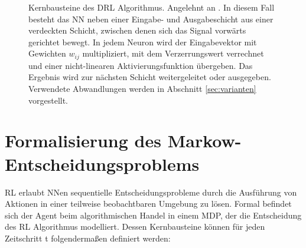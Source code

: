 \begin{figure}[!ht]
\vspace{4mm}
\caption[Kernbausteine des \acs{DRL} Algorithmus]%
{Kernbausteine des \acs{DRL} Algorithmus. Angelehnt an \parencite{drawing}. In diesem Fall besteht das \acs{NN} neben einer Eingabe- und Ausgabeschicht aus einer verdeckten Schicht, zwischen denen sich das Signal vorwärts gerichtet bewegt. In jedem Neuron wird der Eingabevektor mit Gewichten $w_{ij}$ multipliziert, mit dem Verzerrungswert verrechnet und einer nicht-linearen Aktivierungsfunktion übergeben. Das Ergebnis wird zur nächsten Schicht weitergeleitet oder ausgegeben.
Verwendete Abwandlungen werden in Abschnitt \ref{sec:varianten} vorgestellt.}
\label{fig:drlkernbausteine}
\end{figure}

\section{Formalisierung des Markow-Entscheidungsproblems}
\label{sec:formalisierung}

\acs{RL} erlaubt \acs{NN}en sequentielle Entscheidungsprobleme durch die Ausführung von Aktionen in einer teilweise beobachtbaren Umgebung zu lösen.
Formal befindet sich der Agent beim algorithmischen Handel in einem \acs{MDP}, der die Entscheidung des \acs{RL} Algorithmus modelliert. Dessen Kernbausteine können für jeden Zeitschritt t folgendermaßen definiert werden:
